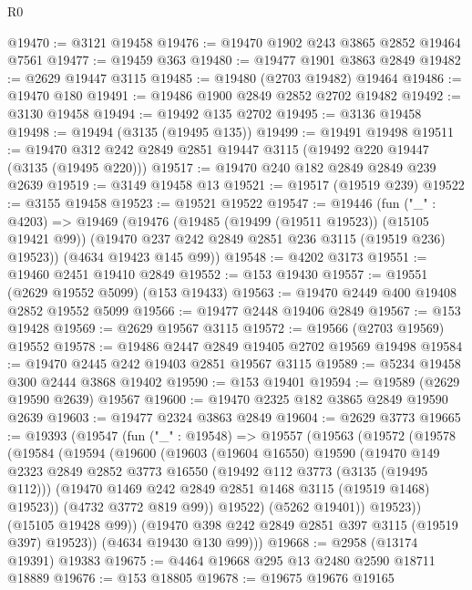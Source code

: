 \begin{lexlean}{R0}
\begin{coremodule}
@19470 := @3121 @19458
@19476 := @19470 @1902 @243 @3865 @2852 @19464 @7561
@19477 := @19459 @363
@19480 := @19477 @1901 @3863 @2849
@19482 := @2629 @19447 @3115
@19485 := @19480 (@2703 @19482) @19464
@19486 := @19470 @180
@19491 := @19486 @1900 @2849 @2852 @2702 @19482
@19492 := @3130 @19458
@19494 := @19492 @135 @2702
@19495 := @3136 @19458
@19498 := @19494 (@3135 (@19495 @135))
@19499 := @19491 @19498
@19511 := @19470 @312 @242 @2849 @2851 @19447 @3115 (@19492 @220 @19447 (@3135 (@19495 @220)))
@19517 := @19470 @240 @182 @2849 @2849 @239 @2639
@19519 := @3149 @19458 @13
@19521 := @19517 (@19519 @239)
@19522 := @3155 @19458
@19523 := @19521 @19522
@19547 := @19446
    (fun ("_" : @4203) =>
    @19469
      (@19476
        (@19485 (@19499 (@19511 @19523)) (@15105 @19421 @99))
        (@19470 @237 @242 @2849 @2851 @236 @3115 (@19519 @236) @19523))
      (@4634 @19423 @145 @99))
@19548 := @4202 @3173
@19551 := @19460 @2451 @19410 @2849
@19552 := @153 @19430
@19557 := @19551 (@2629 @19552 @5099) (@153 @19433)
@19563 := @19470 @2449 @400 @19408 @2852 @19552 @5099
@19566 := @19477 @2448 @19406 @2849
@19567 := @153 @19428
@19569 := @2629 @19567 @3115
@19572 := @19566 (@2703 @19569) @19552
@19578 := @19486 @2447 @2849 @19405 @2702 @19569 @19498
@19584 := @19470 @2445 @242 @19403 @2851 @19567 @3115
@19589 := @5234 @19458 @300 @2444 @3868 @19402
@19590 := @153 @19401
@19594 := @19589 (@2629 @19590 @2639) @19567
@19600 := @19470 @2325 @182 @3865 @2849 @19590 @2639
@19603 := @19477 @2324 @3863 @2849
@19604 := @2629 @3773
@19665 := @19393
    (@19547
      (fun ("_" : @19548) =>
      @19557
        (@19563
          (@19572
            (@19578
              (@19584
                (@19594
                  (@19600
                    (@19603
                      (@19604 @16550)
                      @19590
                      (@19470
                        @149
                        @2323
                        @2849
                        @2852
                        @3773
                        @16550
                        (@19492 @112 @3773 (@3135 (@19495 @112)))
                        (@19470 @1469 @242 @2849 @2851 @1468 @3115 (@19519 @1468) @19523))
                      (@4732 @3772 @819 @99))
                    @19522)
                  (@5262 @19401))
                @19523))
            (@15105 @19428 @99))
          (@19470 @398 @242 @2849 @2851 @397 @3115 (@19519 @397) @19523))
        (@4634 @19430 @130 @99)))
@19668 := @2958 (@13174 @19391) @19383
@19675 := @4464 @19668 @295 @13 @2480 @2590 @18711 @18889
@19676 := @153 @18805
@19678 := @19675 @19676 @19165

\end{coremodule}
\end{lexlean}
